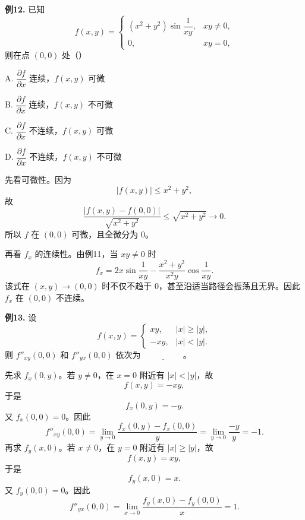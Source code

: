 \begin{problemblock}
\textbf{例12.} 已知
\[
f(x,y)=
\begin{cases}
(x^2+y^2)\sin\dfrac1{xy},&xy\ne0,\\
0,&xy=0,
\end{cases}
\]
则在点 \((0,0)\) 处（\quad）

A. \(\dfrac{\partial f}{\partial x}\) 连续，\(f(x,y)\) 可微

B. \(\dfrac{\partial f}{\partial x}\) 连续，\(f(x,y)\) 不可微

C. \(\dfrac{\partial f}{\partial x}\) 不连续，\(f(x,y)\) 可微

D. \(\dfrac{\partial f}{\partial x}\) 不连续，\(f(x,y)\) 不可微
\end{problemblock}
\begin{solutionblock}
先看可微性。因为
\[
|f(x,y)|\le x^2+y^2,
\]
故
\[
\frac{|f(x,y)-f(0,0)|}{\sqrt{x^2+y^2}}
\le\sqrt{x^2+y^2}\to0.
\]
所以 \(f\) 在 \((0,0)\) 可微，且全微分为 \(0\)。

再看 \(f_x\) 的连续性。由例11，当 \(xy\ne0\) 时
\[
f_x=2x\sin\frac1{xy}
-\frac{x^2+y^2}{x^2y}\cos\frac1{xy}.
\]
该式在 \((x,y)\to(0,0)\) 时不仅不趋于 \(0\)，甚至沿适当路径会振荡且无界。因此 \(f_x\) 在 \((0,0)\) 不连续。
\end{solutionblock}

\begin{problemblock}
\textbf{例13.} 设
\[
f(x,y)=
\begin{cases}
xy,&|x|\ge |y|,\\
-xy,&|x|<|y|.
\end{cases}
\]
则 \(f''_{xy}(0,0)\) 和 \(f''_{yx}(0,0)\) 依次为 \(\underline{\hspace{2cm}}\)。
\end{problemblock}
\begin{solutionblock}
先求 \(f_x(0,y)\)。若 \(y\ne0\)，在 \(x=0\) 附近有 \(|x|<|y|\)，故
\[
f(x,y)=-xy,
\]
于是
\[
f_x(0,y)=-y.
\]
又 \(f_x(0,0)=0\)。因此
\[
f''_{xy}(0,0)
=\lim_{y\to0}\frac{f_x(0,y)-f_x(0,0)}y
=\lim_{y\to0}\frac{-y}{y}=-1.
\]
再求 \(f_y(x,0)\)。若 \(x\ne0\)，在 \(y=0\) 附近有 \(|x|\ge|y|\)，故
\[
f(x,y)=xy,
\]
于是
\[
f_y(x,0)=x.
\]
又 \(f_y(0,0)=0\)。因此
\[
f''_{yx}(0,0)
=\lim_{x\to0}\frac{f_y(x,0)-f_y(0,0)}x
=1.
\]
\end{solutionblock}


